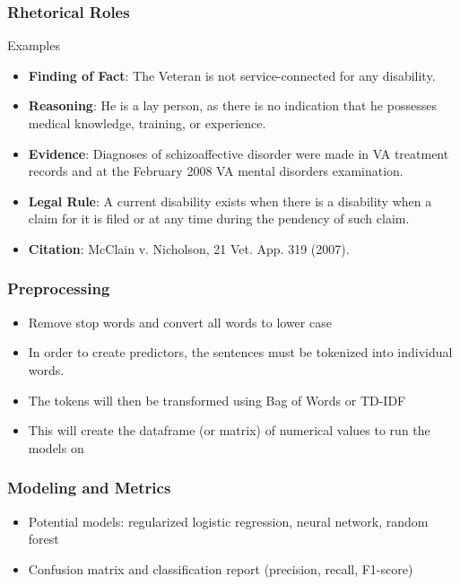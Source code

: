 \documentclass{beamer}
\begin{document}
\begin{frame}
  \frametitle{Rhetorical Roles}
  \footnotesize
  Examples
  \begin{itemize}
  \item \textbf{Finding of Fact}: The Veteran is not service-connected for any disability.
  \item \textbf{Reasoning}: He is a lay person, as there is no indication that he possesses medical knowledge, training, or experience.
  \item \textbf{Evidence}: Diagnoses of schizoaffective disorder were made in VA treatment records and at the February 2008 VA mental disorders examination.
  \item \textbf{Legal Rule}: A current disability exists when there is a disability when a claim for it is filed or at any time during the pendency of such claim.
  \item \textbf{Citation}: McClain v. Nicholson, 21 Vet. App. 319 (2007).
  \end{itemize}
\end{frame}



\begin{frame}
  \frametitle{Preprocessing}
  \footnotesize
  \begin{itemize}
  \item Remove stop words and convert all words to lower case
  \item In order to create predictors, the sentences must be tokenized into individual words.
  \item The tokens will then be transformed using Bag of Words or TD-IDF
  \item This will create the dataframe (or matrix) of numerical values to run the models on
  \end{itemize}
\end{frame}

\begin{frame}
  \frametitle{Modeling and Metrics}
  \begin{itemize}
  \item Potential models: regularized logistic regression, neural network, random forest
  \item Confusion matrix and classification report (precision, recall, F1-score)
  \end{itemize}
\end{frame}
\end{document}
